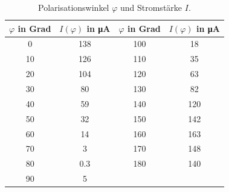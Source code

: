 \begin{table}
 \centering
 \caption{Polarisationswinkel $\varphi$ und Stromstärke $I$.}
 \label{tab:polarisation}
 \begin{tabular}{c c c c}
   \toprule
   $\varphi$ in Grad & $I(\varphi)$ in \si{\micro\ampere} & $\varphi$ in Grad & $I(\varphi)$ in \si{\micro\ampere} \\
   \midrule
   0  & 138 & 100 & 18  \\
   10 & 126 & 110 & 35  \\
   20 & 104 & 120 & 63  \\
   30 & 80  & 130 & 82  \\
   40 & 59  & 140 & 120 \\
   50 & 32  & 150 & 142 \\
   60 & 14  & 160 & 163 \\
   70 & 3   & 170 & 148 \\
   80 & 0.3 & 180 & 140 \\
   90 & 5   & & \\
   \bottomrule
 \end{tabular}
\end{table}
\FloatBarrier
